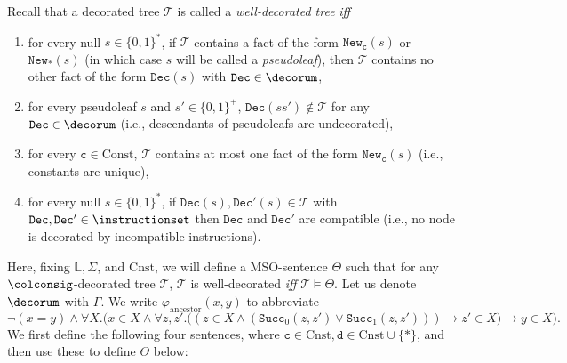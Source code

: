 \documentclass[10pt,a4paper]{amsart}
\theoremstyle{definition}
\numberwithin{equation}{section}
\theoremstyle{plain}
\theoremstyle{definition}
\theoremstyle{myexample}
\theoremstyle{plain}
\theoremstyle{definition}
\newcommand{\cols}{\mathbb{L}}
\newcommand{\newconst}[1]{\pred{New}_{\const{#1}}} %
\newcommand{\newanon}{\pred{New}_{\const{*}}} %
\newcommand{\pred}[1]{\mathtt{#1}}
\newcommand{\const}[1]{\mathtt{#1}}
\newcommand{\iffi}{\textit{iff} } %
\begin{document}
Recall that a decorated tree $\mathcal{T}$ is called a \emph{well-decorated tree} \iffi
\begin{enumerate}
	\item for every null $s\in\{ 0,1 \}^*$, if $\mathcal{T}$ contains a fact of the form $\newconst{c}(s)$ or $\newanon(s)$ (in which case $s$ will be called a \emph{pseudoleaf}), then $\mathcal{T}$ contains no other fact of the form $\pred{Dec}(s)$ with $\pred{Dec}\in\decorum$,
	\item for every pseudoleaf $s$ and $s' \in \{0,1\}^+$, $\pred{Dec}(ss')\not\in \mathcal{T}$ for any $\pred{Dec}\in\decorum$  (i.e., descendants of pseudoleafs are undecorated),  
	\item for every $\const{c}\in\mathrm{Const}$, $\mathcal{T}$ contains at most one fact of the form $\newconst{c}(s)$ (i.e., constants are unique),
	\item for every null $s\in\{ 0,1 \}^*$, if $\pred{Dec}(s),\pred{Dec'}(s) \in \mathcal{T}$ with $\pred{Dec},\pred{Dec'} \in \instructionset$ then $\pred{Dec}$ and $\pred{Dec'}$ are compatible (i.e.,  
	no node is decorated by incompatible instructions).
\end{enumerate}
Here, fixing $\cols, \Sigma$, and $\mathrm{Cnst}$, we will define a MSO-sentence $\Theta$ such that for any $\colconsig$-decorated tree $\mathcal{T}$, $\mathcal{T}$ is well-decorated \iffi $\mathcal{T}\vDash \Theta$.
\newline
Let us denote $\decorum$ with $\Gamma$. We write $\varphi_{\mathrm{ancestor}}(x,y)$ to abbreviate $$\neg(x = y) \wedge \forall X. \big(x\in X \land \forall z, z'. \big((z\in X \land (\pred{Succ}_0(z, z')\lor \pred{Succ}_{1}(z,z')) )\rightarrow z'\in X\big) \rightarrow y \in X\big).$$We first define the following four sentences, where $\const{c}\in\mathrm{Cnst}, \const{d}\in\mathrm{Cnst}{\cup}\{ \ast \}$, and then use these to define $\Theta$ below:
\end{document}
